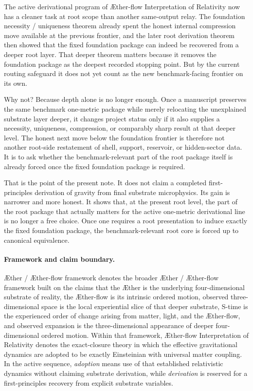 \documentclass[11pt]{article}
\newcommand{\Aether}{\AE{}ther}
\newcommand{\Aflow}{\AE{}ther-flow}
\newcommand{\TheoryName}{\Aflow{} Interpretation of Relativity}
\newcommand{\TheoryProgram}{\Aether{} / \Aflow{} framework}
\begin{document}
The active derivational program of \TheoryName{} now has a cleaner task at root scope than another same-output relay. The foundation necessity / uniqueness theorem already spent the honest internal compression move available at the previous frontier, and the later root derivation theorem then showed that the fixed foundation package can indeed be recovered from a deeper root layer. That deeper theorem matters because it removes the foundation package as the deepest recorded stopping point. But by the current routing safeguard it does not yet count as the new benchmark-facing frontier on its own.

Why not? Because depth alone is no longer enough. Once a manuscript preserves the same benchmark one-metric package while merely relocating the unexplained substrate layer deeper, it changes project status only if it also supplies a necessity, uniqueness, compression, or comparably sharp result at that deeper level. The honest next move below the foundation frontier is therefore not another root-side restatement of shell, support, reservoir, or hidden-sector data. It is to ask whether the benchmark-relevant part of the root package itself is already forced once the fixed foundation package is required.

That is the point of the present note. It does not claim a completed first-principles derivation of gravity from final substrate microphysics. Its gain is narrower and more honest. It shows that, at the present root level, the part of the root package that actually matters for the active one-metric derivational line is no longer a free choice. Once one requires a root presentation to induce exactly the fixed foundation package, the benchmark-relevant root core is forced up to canonical equivalence.

\paragraph{Framework and claim boundary.}
\TheoryProgram{} denotes the broader \Aether{} / \Aflow{} framework built on the claims that the \Aether{} is the underlying four-dimensional substrate of reality, the \Aflow{} is its intrinsic ordered motion, observed three-dimensional space is the local experiential slice of that deeper substrate, S-time is the experienced order of change arising from matter, light, and the \Aflow{}, and observed expansion is the three-dimensional appearance of deeper four-dimensional ordered motion. Within that framework, \TheoryName{} denotes the exact-closure theory in which the effective gravitational dynamics are adopted to be exactly Einsteinian with universal matter coupling. In the active sequence, \emph{adoption} means use of that established relativistic dynamics without claiming substrate derivation, while \emph{derivation} is reserved for a first-principles recovery from explicit substrate variables.
\end{document}
